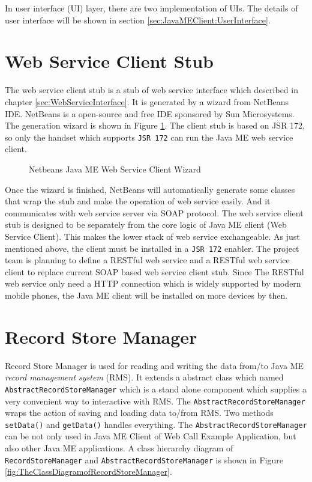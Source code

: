 In user interface (UI) layer, there are two implementation of UIs. The details of user interface will be shown in section \ref{sec:JavaMEClient:UserInterface}. 

\section{Web Service Client Stub}
\label{sec:JavaMEClient:WebServiceClientStub}

The web service client stub is a stub of web service interface which described in chapter \nolinebreak \ref{sec:WebServiceInterface}. It is generated by a wizard from NetBeans IDE. NetBeans is a open-source and free IDE sponsored by Sun Microsystems. The generation wizard is shown in Figure \ref{fig:NetbeansJavaMEWebServiceClientWizard}. The client stub is based on JSR 172, so only the handset which supports \texttt{JSR 172} can run the Java ME web service client.

\begin{figure}[!hbtp]
\centering
{}
\caption{Netbeans Java ME Web Service Client Wizard}
\label{fig:NetbeansJavaMEWebServiceClientWizard}
\end{figure}

Once the wizard is finished, NetBeans will automatically generate some classes that wrap the stub and make the operation of web service easily. And it communicates with web service server via SOAP protocol. The web service client stub is designed to be separately from the core logic of Java ME client (Web Service Client). This makes the lower stack of web service exchangeable. As just mentioned above, the client must be installed in a \texttt{JSR 172} enabler. The project team is planning to define a RESTful web service and a RESTful web service client to replace current SOAP based web service client stub. Since The RESTful web service only need a HTTP connection which is widely supported by modern mobile phones, the Java ME client will be installed on more devices by then. 


\section{Record Store Manager}
\label{sec:JavaMEClient:RecordStoreManager}

Record Store Manager is used for reading and writing the data from/to Java ME \textit{record management system} (RMS). It extends a abstract class which named \texttt{AbstractRecordStoreManager} which is a stand alone component which supplies a very convenient way to interactive with RMS. The \texttt{AbstractRecordStoreManager} wraps the action of saving and loading data to/from RMS. Two methods \texttt{setData()} and \texttt{getData()} handles everything. The \texttt{AbstractRecordStoreManager} can be not only used in Java ME Client of Web Call Example Application, but also other Java ME applications. A class hierarchy diagram of \texttt{RecordStoreManager} and \texttt{AbstractRecordStoreManager} is shown in Figure \ref{fig:TheClassDiagramofRecordStoreManager}.

